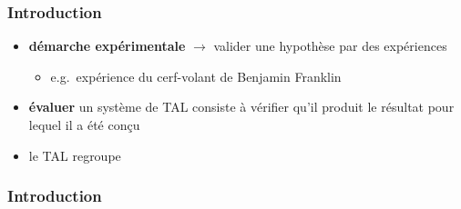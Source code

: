 
\begin{frame}
\frametitle{Introduction}

\begin{itemize} \itemsep0.8em

    \item \textbf{démarche expérimentale} $\to$ valider une hypothèse par des 
          expériences
    \begin{itemize}
        \item e.g.~expérience du cerf-volant de Benjamin Franklin
    \end{itemize}
    \item \textbf{évaluer} un système de TAL consiste à vérifier qu'il produit 
          le résultat pour lequel il a été conçu

    \item le TAL regroupe 
\end{itemize}



\end{frame}


\begin{frame}
\frametitle{Introduction}


\end{frame}
